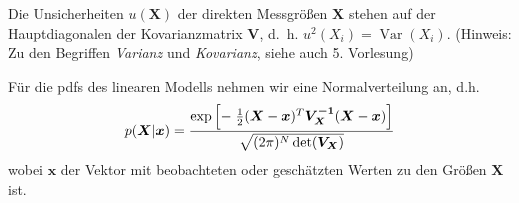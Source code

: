 Die Unsicherheiten $u(\boldsymbol{X})$ der direkten Messgrößen $\boldsymbol{X}$
stehen auf der Hauptdiagonalen der Kovarianzmatrix $\boldsymbol{V}$, d.~h.
$u^2(X_i) = \operatorname{Var}(X_i)$. (Hinweis: Zu den Begriffen \textsl{Varianz} und
\textsl{Kovarianz}, siehe auch 5. Vorlesung)

Für die pdfs des linearen Modells nehmen wir eine Normalverteilung
an, d.h.
\begin{equation}
p(\boldsymbol{X} | \boldsymbol{x}) = \frac{\textstyle \exp \left[- \; \frac{1}{2} (\boldsymbol{X} - \boldsymbol{x})^T \boldsymbol{V_X^{-1}} (\boldsymbol{X}-\boldsymbol{x}) \right]}{\textstyle \sqrt{(2 \pi)^N \operatorname{det}(\boldsymbol{V_X})}}
\label{eq:pdf_linearModell}
\end{equation}
wobei $\boldsymbol{x}$ der Vektor mit beobachteten oder geschätzten
Werten zu den Größen $\boldsymbol{X}$ ist.


